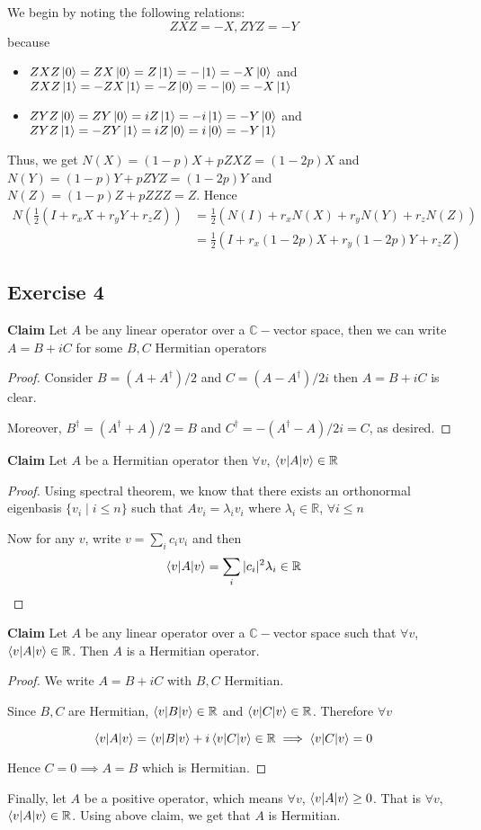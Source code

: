 \documentclass{article}
\begin{document}
We begin by noting the following relations: 
$$ZXZ = -X, ZYZ = -Y$$
because
\begin{itemize}
    \item $ZXZ\ket0 = ZX\ket0 = Z\ket1 = - \ket1 = -X\ket0$ and $ZXZ\ket1 = -ZX\ket1 = -Z\ket0 = - \ket0 = -X\ket1$
    \item $ZYZ\ket0 = ZY\ket0 = iZ\ket1 = - i\ket1 = -Y\ket0$ and $ZYZ\ket1 = -ZY\ket1 = iZ\ket0 = i\ket0 = -Y\ket1$ \\
\end{itemize}

Thus, we get $N(X) = (1-p)X + pZXZ = (1-2p)X$ and $N(Y) = (1-p)Y + pZYZ = (1-2p)Y$ and $N(Z) = (1-p)Z + pZZZ = Z$. Hence
\begin{align*}
    N\left(\frac12 (I + r_x X + r_y Y + r_z Z)\right) &= \frac12 (N(I) + r_x N(X) + r_y N(Y) + r_z N(Z)) \\
    &= \frac12 (I + r_x (1-2p)X + r_y (1-2p) Y + r_z Z)
\end{align*}

\subsection*{Exercise 4}
\textbf{Claim} Let $A$ be any linear operator over a $\mathbb{C}-$vector space, then we can write $A = B+iC$ for some $B,C$ Hermitian operators
\begin{proof}
Consider $B = (A+A^\dagger)/2$ and $C = (A-A^\dagger)/2i$ then $A = B+iC$ is clear.

Moreover, $B^\dagger = (A^\dagger + A)/2 = B$ and $C^\dagger = -(A^\dagger-A)/2i = C$, as desired.
\end{proof}

\textbf{Claim} Let $A$ be a Hermitian operator then $\forall v$, $\braket{v|A|v} \in \mathbb{R}$
\begin{proof}
Using spectral theorem, we know that there exists an orthonormal eigenbasis $\{v_i \mid i \leq n\}$ such that $Av_i = \lambda_i v_i$ where $\lambda_i \in \mathbb{R}$, $\forall i \leq n$

Now for any $v$, write $v = \sum_i c_i v_i$ and then
$$\braket{v|A|v} = \sum_i |c_i|^2 \lambda_i \in \mathbb{R}$$
\end{proof}

\textbf{Claim} Let $A$ be any linear operator over a $\mathbb{C}-$vector space such that $\forall v$, $\braket{v|A|v} \in \mathbb{R}$. Then $A$ is a  Hermitian operator.
\begin{proof}
We write $A = B+iC$ with $B,C$ Hermitian.

Since $B,C$ are Hermitian, $\braket{v|B|v} \in \mathbb{R}$ and $\braket{v|C|v} \in \mathbb{R}$. Therefore $\forall v$

$$\braket{v|A|v} = \braket{v|B|v} + i\braket{v|C|v} \in \mathbb{R} \implies \braket{v|C|v} = 0$$

Hence $C = 0 \implies A = B$ which is Hermitian.
\end{proof}

Finally, let $A$ be a positive operator, which means $\forall v$, $\braket{v|A|v} \geq 0$. That is $\forall v$, $\braket{v|A|v} \in \mathbb{R}$. Using above claim, we get that $A$ is Hermitian.
\end{document}
